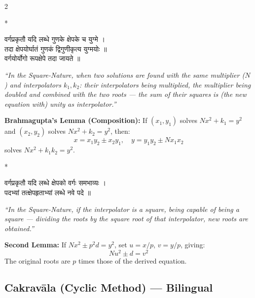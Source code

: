 \documentclass[11pt,a4paper]{article}
\newcommand{\dev}[1]{{\devanagarifont #1}}
\theoremstyle{definition}
\begin{document}
\begin{paracol}{2}

\switchcolumn[0]*\noindent
\begin{tcolorbox}[colback=sktbg,colframe=vertrule,boxrule=0.5pt,arc=3pt]
\dev{वर्गप्रकृतौ यदि लब्धे गुणके क्षेपके च युग्मे ।\\
तदा क्षेपयोर्घातं गुणकं द्विगुणीकृत्य युग्मयोः ॥}\\[0.3cm]
\dev{वर्गयोर्योगो रूपक्षेपे तदा जायते ॥}
\end{tcolorbox}

\switchcolumn\noindent
\begin{tcolorbox}[colback=transbg,colframe=vertrule!60,boxrule=0.5pt,arc=3pt]
\textit{``In the Square-Nature, when two solutions are found with the same multiplier ($N$) and interpolators $k_1, k_2$: their interpolators being multiplied, the multiplier being doubled and combined with the two roots --- the sum of their squares is (the new equation with) unity as interpolator.''}

\textbf{Brahmagupta's Lemma (Composition):} If $(x_1, y_1)$ solves $Nx^2 + k_1 = y^2$ and $(x_2, y_2)$ solves $Nx^2 + k_2 = y^2$, then:
\[x = x_1 y_2 \pm x_2 y_1, \quad y = y_1 y_2 \pm N x_1 x_2\]
solves $Nx^2 + k_1 k_2 = y^2$.
\end{tcolorbox}

\switchcolumn[0]*\noindent
\begin{tcolorbox}[colback=sktbg,colframe=vertrule,boxrule=0.5pt,arc=3pt]
\dev{वर्गप्रकृतौ यदि लब्धे क्षेपको वर्गः समभाव्यः ।\\
पदभ्यां तत्क्षेपहृताभ्यां लब्धे नवे पदे ॥}
\end{tcolorbox}

\switchcolumn\noindent
\begin{tcolorbox}[colback=transbg,colframe=vertrule!60,boxrule=0.5pt,arc=3pt]
\textit{``In the Square-Nature, if the interpolator is a square, being capable of being a square --- dividing the roots by the square root of that interpolator, new roots are obtained.''}

\textbf{Second Lemma:} If $Nx^2 \pm p^2 d = y^2$, set $u = x/p$, $v = y/p$, giving:
\[Nu^2 \pm d = v^2\]
The original roots are $p$ times those of the derived equation.
\end{tcolorbox}

\end{paracol}

\subsection*{Cakrav\=ala (Cyclic Method) --- Bilingual}
\end{document}
